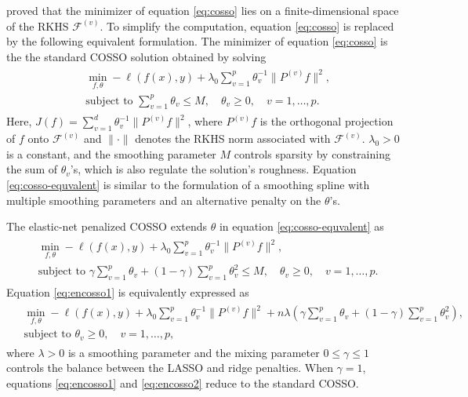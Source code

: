 \citet{Lin:2006} proved that the minimizer of equation \eqref{eq:cosso} lies on a finite-dimensional space of the RKHS \(\mathcal{F}^{(v)}\). To simplify the computation, equation \eqref{eq:cosso} is replaced by the following equivalent formulation. The minimizer of equation \eqref{eq:cosso} is the the standard COSSO solution obtained by solving
\begin{align}
    \begin{split}
        &\min_{f, \theta} -\ell(f(x), y) + \lambda_0 \sum_{v=1}^{p} \theta_v^{-1} \|P^{(v)} f\|^2, \\
        &\text{subject to } \sum_{v=1}^{p} \theta_v \leq M, \quad \theta_v \geq 0, \quad v = 1, \dots, p.
    \end{split}
    \label{eq:cosso-equvalent} 
\end{align}
Here, \(J(f) = \sum_{v=1}^{d} \theta_v^{-1} \|P^{(v)} f\|^2\), where \(P^{(v)} f\) is the orthogonal projection of \(f\) onto \(\mathcal{F}^{(v)}\) and \(\| \cdot \|\) denotes the RKHS norm associated with \(\mathcal{F}^{(v)}\). \(\lambda_0 > 0\) is a constant, and the smoothing parameter \(M\) controls sparsity by constraining the sum of \(\theta_v\)'s, which is also regulate the solution's roughness. Equation \eqref{eq:cosso-equvalent} is similar to the formulation of a smoothing spline with multiple smoothing parameters and an alternative penalty on the \(\theta\)'s.

The elastic-net penalized COSSO extends \(\theta\) in equation \eqref{eq:cosso-equvalent} as
\begin{align}
    \begin{split}
        &\min_{f, \theta} -\ell(f(x), y) + \lambda_0 \sum_{v=1}^{p} \theta_v^{-1} \|P^{(v)} f\|^2, \\
        &\text{subject to } \gamma \sum_{v=1}^{p} \theta_v + (1 - \gamma) \sum_{v=1}^{p} \theta_v^2 \leq M, \quad \theta_v \geq 0, \quad v = 1, \dots, p.
    \end{split}
    \label{eq:encosso1} 
\end{align}
Equation \eqref{eq:encosso1} is equivalently expressed as
\begin{align}
    \begin{split}
        &\min_{f, \theta} -\ell(f(x), y) + \lambda_0 \sum_{v=1}^{p} \theta_v^{-1} \|P^{(v)} f\|^2  + n\lambda \left( \gamma \sum_{v=1}^{p} \theta_v + (1 - \gamma) \sum_{v=1}^{p} \theta_v^2 \right), \\
        &\text{subject to } \theta_v \geq 0, \quad v = 1, \dots, p,
    \end{split}
    \label{eq:encosso2} 
\end{align}
where \(\lambda>0\) is a smoothing parameter and the mixing parameter \(0 \leq \gamma \leq 1\) controls the balance between the LASSO and ridge penalties. When \(\gamma = 1\), equations \eqref{eq:encosso1} and \eqref{eq:encosso2} reduce to the standard COSSO.

